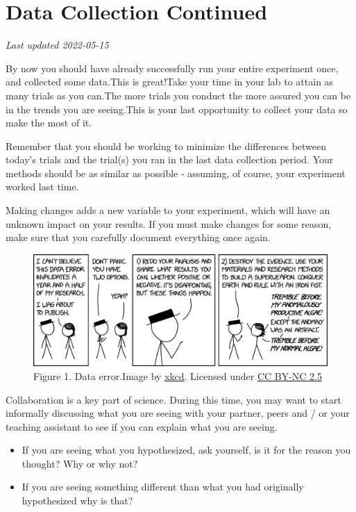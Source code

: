 \documentclass[
]{book}
\providecommand{\tightlist}{%
  \setlength{\itemsep}{0pt}\setlength{\parskip}{0pt}}
\begin{document}
\hypertarget{data-collection-continued}{%
\chapter*{Data Collection Continued}\label{data-collection-continued}}

\emph{Last updated 2022-05-15}

By now you should have already successfully run your entire experiment once, and collected some data.This is great!Take your time in your lab to attain as many trials as you can.The more trials you conduct the more assured you can be in the trends you are seeing.This is your last opportunity to collect your data so make the most of it.

Remember that you should be working to minimize the differences between today's trials and the trial(s) you ran in the last data collection period. Your methods should be as similar as possible - assuming, of course, your experiment worked last time.

Making changes adds a new variable to your experiment, which will have an unknown impact on your results. If you must make changes for some reason, make sure that you carefully document everything once again.

\begin{figure}
\centering
\includegraphics{figures_images/Lab8-Fig1.png}
\caption{Figure 1. Data error.Image by \href{https://xkcd.com/2239/}{xkcd}. Licensed under \href{https://creativecommons.org/licenses/by-nc/2.5/}{CC BY-NC 2.5}}
\end{figure}

Collaboration is a key part of science. During this time, you may want to start informally discussing what you are seeing with your partner, peers and / or your teaching assistant to see if you can explain what you are seeing.

\begin{itemize}
\tightlist
\item
  If you are seeing what you hypothesized, ask yourself, is it for the reason you thought? Why or why not?
\item
  If you are seeing something different than what you had originally hypothesized why is that?
\end{itemize}
\end{document}
